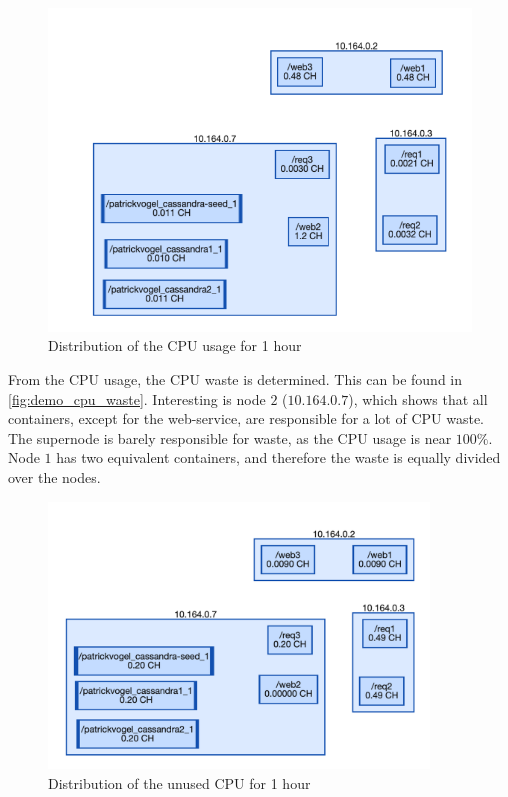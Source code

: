 \begin{figure}[hbt!]
    \centering
    \includegraphics[width=\textwidth]{gfx/demo_cpu_cost}
    \caption{Distribution of the CPU usage for 1 hour}
    \label{fig:demo_cpu_cost}
\end{figure}

\noindent
From the CPU usage, the CPU waste is determined. This can be found in \autoref{fig:demo_cpu_waste}. Interesting is node $2$ ($10$.$164$.$0$.$7$), which shows that all containers, except for the web-service, are responsible for a lot of CPU waste. The supernode is barely responsible for waste, as the CPU usage is near $100\%$. Node $1$ has two equivalent containers, and therefore the waste is equally divided over the nodes.\\

\begin{figure}[H]
    \centering
    \includegraphics[width=0.9\textwidth]{gfx/demo_cpu_waste}
    \caption{Distribution of the unused CPU for 1 hour}
    \label{fig:demo_cpu_waste}
\end{figure}

